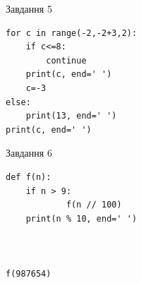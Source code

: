 \documentclass[12pt, ukrainian]{article}
\begin{document}
{\vspace{15mm}
\begin{minipage}[t]{9.7cm}                
{\begin{center}Завдання {5}\end{center}}
\begin{verbatim}
for c in range(-2,-2+3,2):
    if c<=8:
        continue
    print(c, end=' ')
    c=-3
else:
    print(13, end=' ')
print(c, end=' ')
\end{verbatim}     
\end{minipage}
\vline \hspace{8mm}
\begin{minipage}[t]{8.0cm}                
{\begin{center}Завдання {6}\end{center}}
\begin{verbatim}
def f(n):
    if n > 9:
            f(n // 100)
    print(n % 10, end=' ')
    


f(987654)
\end{verbatim}     
\end{minipage}

}
\newpage
\end{document}
